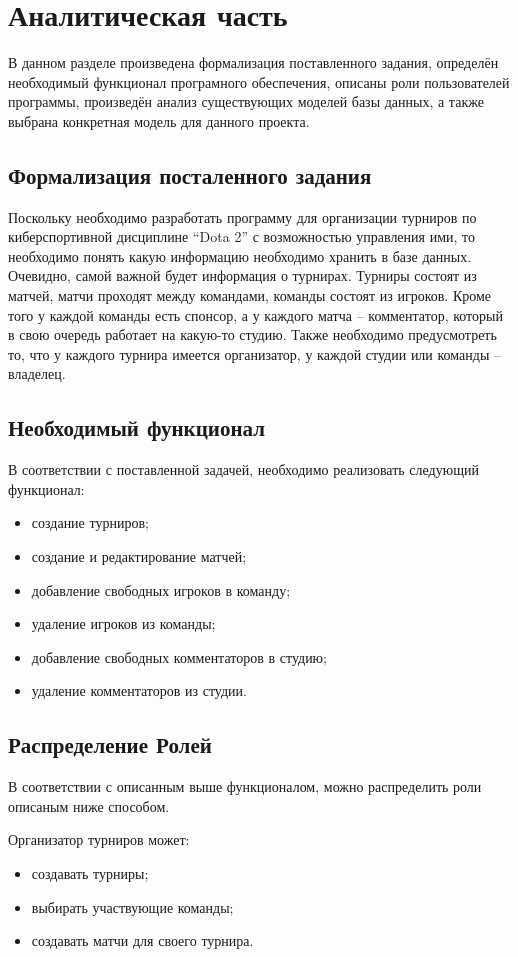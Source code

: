 \chapter{Аналитическая часть}
В данном разделе произведена формализация поставленного задания, определён необходимый функционал програмного обеспечения, описаны роли пользователей программы, произведён анализ существующих моделей базы данных, а также выбрана конкретная модель для данного проекта.

\section{Формализация посталенного задания}
Поскольку необходимо разработать программу для организации турниров по киберспортивной дисциплине “Dota 2” с возможностью управления ими, то необходимо понять какую информацию необходимо хранить в базе данных. Очевидно, самой важной будет информация о турнирах. Турниры состоят из матчей, матчи проходят между командами, команды состоят из игроков. Кроме того у каждой команды есть спонсор, а у каждого матча -- комментатор, который в свою очередь работает на какую-то студию. Также необходимо предусмотреть то, что у каждого турнира имеется организатор, у каждой студии или команды -- владелец.

\section{Необходимый функционал}
В соответствии с поставленной задачей, необходимо реализовать следующий функционал:
\begin{itemize}
	\item создание турниров;
	\item создание и редактирование матчей;
	\item добавление свободных игроков в команду;
	\item удаление игроков из команды;
	\item добавление свободных комментаторов в студию;
	\item удаление комментаторов из студии.
\end{itemize}

\section{Распределение Ролей}
В соответствии с описанным выше функционалом, можно распределить роли описаным ниже способом.

Организатор турниров может:
\begin{itemize}
	\item создавать турниры;
	\item выбирать участвующие команды;
	\item создавать матчи для своего турнира.
\end{itemize}

